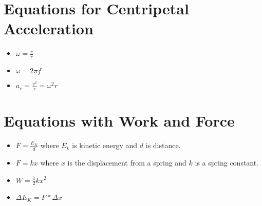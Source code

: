 \documentclass{article}
\begin{document}
\section{Equations for Centripetal Acceleration}
\begin{itemize}
  \item $\omega = \frac{v}{r}$
  \item $\omega = 2\pi f$
  \item $a_c = \frac{v^2}{r} = \omega^2 r$
\end{itemize}

\section{Equations with Work and Force}
\begin{itemize}
  \item $F = \frac{E_K}{d}$ where $E_k$ is kinetic energy and $d$ is distance.
  \item $F = kx$ where $x$ is the displacement from a spring and $k$ is a spring constant.
  \item $W = \frac{1}{2}kx^2$
  \item $\Delta E_K = F * \Delta x$
\end{itemize}
\end{document}
